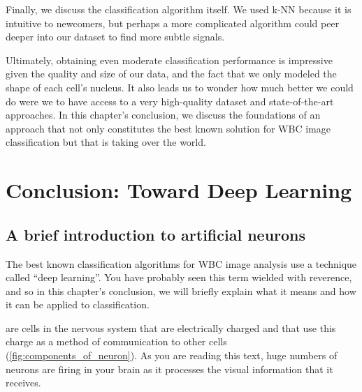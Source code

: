 \begin{qbox}\end{qbox}

Finally, we discuss the classification algorithm itself. We used k-NN because it is intuitive to newcomers, but perhaps a more complicated algorithm could peer deeper into our dataset to find more subtle signals.

Ultimately, obtaining even moderate classification performance is impressive given the quality and size of our data, and the fact that we only modeled the shape of each cell's nucleus. It also leads us to wonder how much better we could do were we to have access to a very high-quality dataset and state-of-the-art approaches. In this chapter's conclusion, we discuss the foundations of an approach that not only constitutes the best known solution for WBC image classification but that is taking over the world.\\

\FloatBarrier
{}
\section{Conclusion: Toward Deep Learning}
\label{sec:conclusion}

\subsection{A brief introduction to artificial neurons}

The best known classification algorithms for WBC image analysis use a technique called ``deep learning''. You have probably seen this term wielded with reverence, and so in this chapter's conclusion, we will briefly explain what it means and how it can be applied to classification.

 are cells in the nervous system that are electrically charged and that use this charge as a method of communication to other cells (\autoref{fig:components_of_neuron}). As you are reading this text, huge numbers of neurons are firing in your brain as it processes the visual information that it receives.


